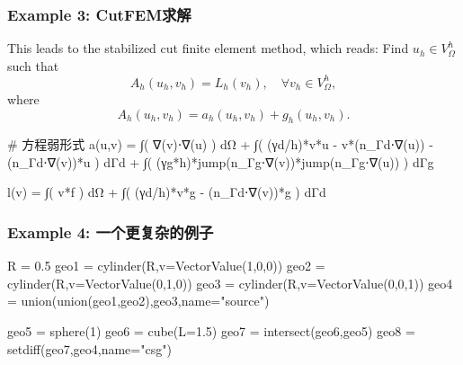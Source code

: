 \documentclass[lang=en,aspectratio=43,theme=default,logo=on]{simplebeamer}
\begin{document}
\begin{frame}[fragile]
    \frametitle{Example 3: CutFEM求解}
This leads to the stabilized cut finite element method, which reads: Find $u_h \in V_\Omega^h$ such that
\begin{equation*}
    A_h(u_h, v_h) = L_h(v_h), \quad \forall v_h \in V_\Omega^h,
\end{equation*}
where
\begin{equation*}
    A_h(u_h,v_h) = a_h(u_h,v_h) + g_h(u_h, v_h).
\end{equation*}
\begin{code}
# 方程弱形式
a(u,v) = ∫( ∇(v)⋅∇(u) ) dΩ +
∫( (γd/h)*v*u  - v*(n_Γd⋅∇(u)) - (n_Γd⋅∇(v))*u ) dΓd +
∫( (γg*h)*jump(n_Γg⋅∇(v))*jump(n_Γg⋅∇(u)) ) dΓg

l(v) = ∫( v*f ) dΩ +
∫( (γd/h)*v*g - (n_Γd⋅∇(v))*g ) dΓd
\end{code}
\end{frame}


\begin{frame}[fragile]
    \frametitle{Example 4: 一个更复杂的例子}
\begin{code}
R = 0.5
geo1 = cylinder(R,v=VectorValue(1,0,0))
geo2 = cylinder(R,v=VectorValue(0,1,0))
geo3 = cylinder(R,v=VectorValue(0,0,1))
geo4 = union(union(geo1,geo2),geo3,name="source")

geo5 = sphere(1)
geo6 = cube(L=1.5)
geo7 = intersect(geo6,geo5)
geo8 = setdiff(geo7,geo4,name="csg")
\end{code}
\end{frame}
\end{document}
